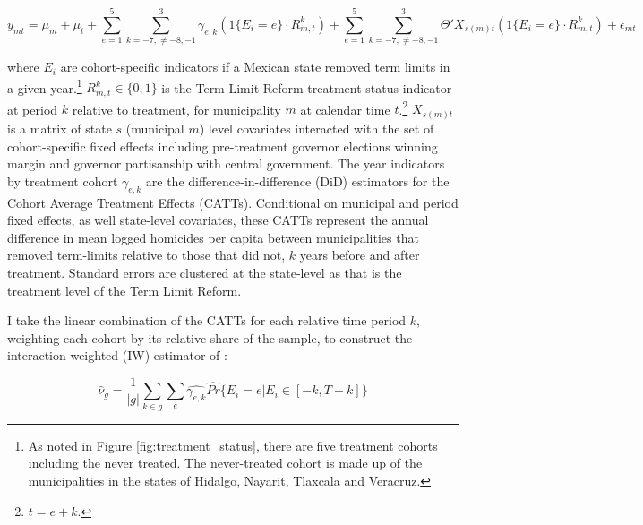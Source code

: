 \documentclass[12pt]{amsart}
\numberwithin{equation}{section}
\theoremstyle{definition}
\theoremstyle{definition}
\theoremstyle{definition}
\begin{document}
 
 \begin{equation}
\label{eq:abraham} 
y_{mt}=\mu_m + \mu_t + \sum^{5}_{e=1} \sum^3_{k=-7, \neq {-8,-1}} \gamma_{e,k}(1\{E_i=e\} \cdot R^k_{m,t}) + \sum^{5}_{e=1} \sum^3_{k=-7, \neq {-8,-1}}  \Theta'X_{s(m)t} (1\{E_i=e\} \cdot R^k_{m,t}) + \epsilon_{mt}
\end{equation} 
  
where $E_i$ are cohort-specific indicators if a Mexican state removed term limits in a given year.\footnote{As noted in Figure \ref{fig:treatment_status}, there are five treatment cohorts including the never treated. The never-treated cohort is made up of the municipalities in the states of Hidalgo, Nayarit, Tlaxcala and Veracruz.} $R^k_{m,t}\in \{0,1\}$  is the Term Limit Reform treatment status indicator at period $k$ relative to treatment, for municipality $m$ at calendar time $t$.\footnote{$t=e+k$.} $X_{s(m)t}$ is a matrix of state $s$ (municipal $m$) level covariates interacted with the set of cohort-specific fixed effects including pre-treatment governor elections winning margin and governor partisanship with central government.  The year indicators by treatment cohort  $\gamma_{e,k}$ are the difference-in-difference (DiD) estimators for the Cohort Average Treatment Effects (CATTs). Conditional on municipal and period fixed effects, as well state-level covariates, these CATTs represent the annual difference in mean logged homicides per capita between municipalities that removed term-limits relative to those that did not, $k$ years before and after treatment. Standard errors are clustered at the state-level as that is the treatment level of the Term Limit Reform.    

I take the linear combination of the CATTs for each relative time period $k$, weighting each cohort by its relative share of the sample, to construct the interaction weighted (IW) estimator of \citet{abraham_sun_2020}:   

\begin{equation}
\hat{\nu}_g=\frac{1}{|g|}\sum_{k \in g}\sum_e \hat{\gamma_{e,k}} \hat{Pr}\{E_i=e | E_i \in [-k, T-k]\}	
\end{equation}
\end{document}
